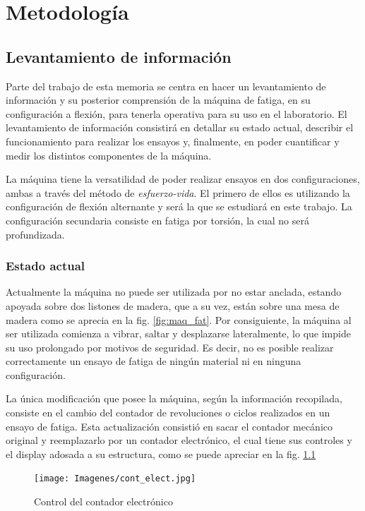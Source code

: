 \chapter{Metodología}
\section{Levantamiento de información}
\label{sec:lev_info}
Parte del trabajo de esta memoria se centra en hacer un levantamiento de información y su posterior comprensión de la máquina de fatiga, en su configuración a flexión, para tenerla operativa para su uso en el laboratorio. El levantamiento de información consistirá en detallar su estado actual, describir el funcionamiento para realizar los ensayos y, finalmente, en poder cuantificar y medir los distintos componentes de la máquina.

La máquina tiene la versatilidad de poder realizar ensayos en dos configuraciones, ambas a través del método de \textit{esfuerzo-vida}. El primero de ellos es utilizando la configuración de flexión alternante y será la que se estudiará en este trabajo. La configuración secundaria consiste en fatiga por torsión, la cual no será profundizada. 

\subsection{Estado actual}
Actualmente la máquina no puede ser utilizada por no estar anclada, estando apoyada sobre dos listones de madera, que a su vez, están sobre una mesa de madera como se aprecia en la fig. \ref{fig:maq_fat}. Por consiguiente, la máquina al ser utilizada comienza a vibrar, saltar y desplazarse lateralmente, lo que impide su uso prolongado por motivos de seguridad. Es decir, no es posible realizar correctamente un ensayo de fatiga de ningún material ni en ninguna configuración.

La única modificación que posee la máquina, según la información recopilada, consiste en el cambio del contador de revoluciones o ciclos realizados en un ensayo de fatiga. Esta actualización consistió en sacar el contador mecánico original y reemplazarlo por un contador electrónico, el cual tiene sus controles y el display adosada a su estructura, como se puede apreciar en la fig. \ref{fig:cont_elect}

\begin{figure}[h]
\centering
\texttt{[image: Imagenes/cont\_elect.jpg]}
\caption{Control del contador electrónico}
\label{fig:cont_elect}
\end{figure}

